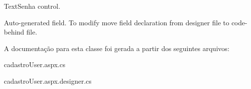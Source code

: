 TextSenha control. 

Auto-\/generated field. To modify move field declaration from designer file to code-\/behind file. 

A documentação para esta classe foi gerada a partir dos seguintes arquivos:\begin{DoxyCompactItemize}
\item 
cadastroUser.aspx.cs\item 
cadastroUser.aspx.designer.cs\end{DoxyCompactItemize}
